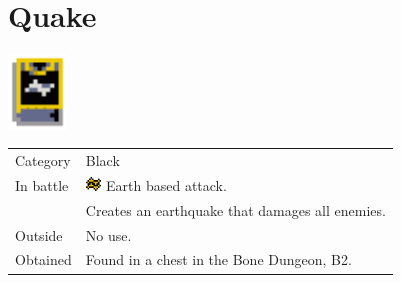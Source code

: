 \section{Quake}
\label{spell:quake}

\includegraphics[height=2cm,keepaspectratio]{./resources/spells/quake}

\begin{longtable}{ l p{9cm} }
	Category
	& Black
\\ %
	In battle
	& \includegraphics[height=1em,keepaspectratio]{./resources/effects/earth} Earth based attack. \\
	& Creates an earthquake that damages all enemies.
\\ %
	Outside
	& No use.
\\ %
	Obtained
	& Found in a chest in the Bone Dungeon, B2.
\end{longtable}

